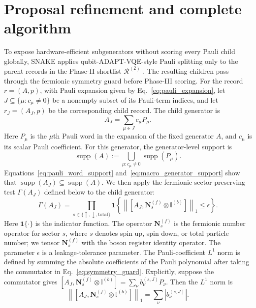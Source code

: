 \documentclass[
  reprint,
  amsmath,
  amssymb,
  aps,
  pra,
  nofootinbib,
  superscriptaddress,
  floatfix
]{revtex4-2}
\begin{document}
\section{Proposal refinement and complete algorithm}
\label{subsec:proposal_refinement_update}
To expose hardware-efficient subgenerators without scoring every Pauli child
globally, \textsc{SNAKE} applies qubit-ADAPT-VQE-style Pauli splitting only to
the parent records in the Phase-II shortlist \(\mathcal R^{(2)}\)
\cite{Tang2021}. The resulting children pass through the fermionic symmetry
guard before Phase-III scoring.
For the record
\(r=(A,p)\), with Pauli expansion given by Eq.~\eqref{eq:pauli_expansion}, let
\(J\subseteq\{\mu:c_\mu\ne0\}\) be a nonempty subset of its Pauli-term
indices, and let
\(r_J=(A_J,p)\) be the corresponding child record. The child generator is
\begin{equation*}
A_J=\sum_{\mu\in J}c_{\mu}P_{\mu}.
\end{equation*}
Here \(P_{\mu}\) is the \(\mu\)th Pauli word in the expansion of the fixed
generator \(A\), and \(c_{\mu}\) is its scalar Pauli coefficient.
For this generator, the generator-level support is
\begin{equation}
\operatorname{supp}(A)
:=
\bigcup_{\mu:c_{\mu}\ne0}
\operatorname{supp}(P_{\mu}).
\label{eq:macro_generator_support}
\end{equation}
Equations~\eqref{eq:pauli_word_support} and~\eqref{eq:macro_generator_support}
show that
\(\operatorname{supp}(A_J)\subseteq\operatorname{supp}(A)\). We then apply
the fermionic sector-preserving test \(\Gamma(A_J)\) defined below to the
child generator:
\begin{equation}
\Gamma(A_J)
=
\prod_{s\in\{\uparrow,\downarrow,\mathrm{total}\}}
\mathbf 1
\left\{
\left\|
\left[
A_J,\mathbf N_s^{(f)}\otimes \mathbb I^{(b)}
\right]
\right\|_1
\le \epsilon
\right\}.
\label{eq:symmetry_guard}
\end{equation}
Here \(\mathbf 1\{\cdot\}\) is the indicator function. The operator \(\mathbf N_s^{(f)}\) is the fermionic number operator for sector \(s\), where \(s\) denotes spin up, spin
down, or total particle number; we tensor \(\mathbf N_s^{(f)}\) with the boson
register identity operator. The parameter \(\epsilon\) is a leakage-tolerance
parameter. The Pauli-coefficient \(L^1\) norm is defined by summing the absolute
coefficients of the Pauli polynomial after taking the commutator in
Eq.~\eqref{eq:symmetry_guard}. Explicitly, suppose the commutator gives
\([A_J,\mathbf N_s^{(f)}\otimes \mathbb I^{(b)}]
=\sum_\nu b_\nu^{(s,J)}P_\nu\). Then the \(L^1\) norm is
\[
\left\|
\left[
A_J,\mathbf N_s^{(f)}\otimes \mathbb I^{(b)}
\right]
\right\|_1
=
\sum_\nu |b_\nu^{(s,J)}|.
\]
\end{document}

